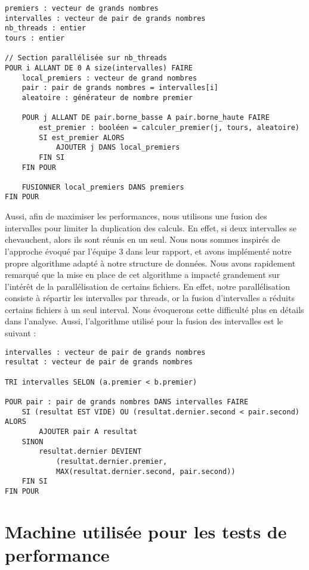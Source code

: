\documentclass[a4paper, french]{article}
\begin{document}
\begin{lstlisting}[style=txt] 
premiers : vecteur de grands nombres 
intervalles : vecteur de pair de grands nombres
nb_threads : entier
tours : entier

// Section parallélisée sur nb_threads
POUR i ALLANT DE 0 A size(intervalles) FAIRE
    local_premiers : vecteur de grand nombres
    pair : pair de grands nombres = intervalles[i]
    aleatoire : générateur de nombre premier

    POUR j ALLANT DE pair.borne_basse A pair.borne_haute FAIRE
        est_premier : booléen = calculer_premier(j, tours, aleatoire)
        SI est_premier ALORS
            AJOUTER j DANS local_premiers
        FIN SI
    FIN POUR

    FUSIONNER local_premiers DANS premiers
FIN POUR
\end{lstlisting}

Aussi, afin de maximiser les performances, nous utilisons une fusion des intervalles pour limiter la
duplication des calculs. En effet, si deux intervalles se chevauchent, alors ils sont réunis en un
seul. Nous nous sommes inspirés de l'approche évoqué par l'équipe 3 dans leur rapport, et avons
implémenté notre propre algorithme adapté à notre structure de données. Nous avons rapidement
remarqué que la mise en place de cet algorithme a impacté grandement sur l'intérêt de la
parallélisation de certains fichiers. En effet, notre parallélisation consiste à répartir les
intervalles par threads, or la fusion d'intervalles a réduits certains fichiers à un seul interval. Nous
évoquerons cette difficulté plus en détails dans l'analyse. Aussi, l'algorithme utilisé pour la
fusion des intervalles est le suivant :

\newpage

\begin{lstlisting}[style=txt] 
intervalles : vecteur de pair de grands nombres
resultat : vecteur de pair de grands nombres

TRI intervalles SELON (a.premier < b.premier)

POUR pair : pair de grands nombres DANS intervalles FAIRE
    SI (resultat EST VIDE) OU (resultat.dernier.second < pair.second) ALORS
        AJOUTER pair A resultat
    SINON 
        resultat.dernier DEVIENT 
            (resultat.dernier.premier, 
            MAX(resultat.dernier.second, pair.second))
    FIN SI
FIN POUR
\end{lstlisting}

\section{Machine utilisée pour les tests de performance}
\end{document}
